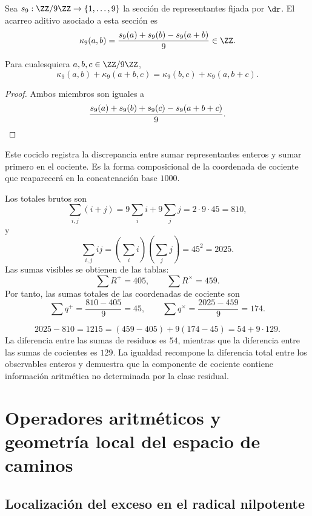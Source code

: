 Sea \(s_9:\ZZ/9\ZZ\to\{1,\ldots,9\}\) la sección de representantes fijada
por \(\dr\). El acarreo aditivo asociado a esta sección es
\[
 \kappa_9(a,b)
 =\frac{s_9(a)+s_9(b)-s_9(a+b)}9\in\ZZ.
\]

\begin{lemma}
\label{lem:app-cociclo-acarreo}
Para cualesquiera \(a,b,c\in\ZZ/9\ZZ\),
\[
 \kappa_9(a,b)+\kappa_9(a+b,c)
 =\kappa_9(b,c)+\kappa_9(a,b+c).
\]
\end{lemma}

\begin{proof}
Ambos miembros son iguales a
\[
 \frac{s_9(a)+s_9(b)+s_9(c)-s_9(a+b+c)}9.\qedhere
\]
\end{proof}

Este cociclo registra la discrepancia entre sumar representantes enteros y
sumar primero en el cociente. Es la forma composicional de la coordenada de
cociente que reaparecerá en la concatenación base \(1000\).

Los totales brutos son
\[
\sum_{i,j}(i+j)
=9\sum_i i+9\sum_j j
=2\cdot9\cdot45
=810,
\]
y
\[
\sum_{i,j}ij
=\left(\sum_i i\right)\left(\sum_j j\right)
=45^2
=2025.
\]
Las sumas visibles se obtienen de las tablas:
\[
\sum R^+=405,
\qquad
\sum R^\times=459.
\]
Por tanto, las sumas totales de las coordenadas de cociente son
\[
\sum q^+=\frac{810-405}{9}=45,
\qquad
\sum q^\times=\frac{2025-459}{9}=174.
\]

\begin{exactbox}[title={Descomposición exacta de la diferencia integrada}]
\[
\boxed{
2025-810
=1215
=(459-405)+9(174-45)
=54+9\cdot129.}
\]
La diferencia entre las sumas de residuos es \(54\), mientras que la
diferencia entre las sumas de cocientes es \(129\). La igualdad recompone la
diferencia total entre los observables enteros y demuestra que la componente
de cociente contiene información aritmética no determinada por la clase
residual.
\end{exactbox}

\fi

\ifdefined\HMTAPPDevelopments
\chapter{Operadores aritméticos y geometría local del espacio de caminos}
\label{chap:app-operadores}

\section{Localización del exceso en el radical nilpotente}

